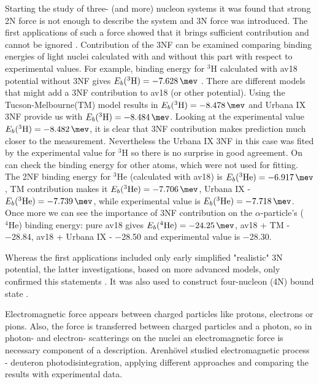 Starting the study of three- (and more) nucleon systems it was found that 
strong 2N force is not enough to describe
the system and 3N force was introduced. The first applications of such
a force showed that it brings sufficient contribution and cannot be ignored \cite{GLOCKLE1982343}.
Contribution of the 3NF can be examined comparing binding energies of light nuclei calculated
with and without this part with respect to experimental values.  
For example, binding energy for $^3$H calculated with \gls{av18} potential
without 3NF gives $E_b(^3\mathrm{H}) = \SI{-7.628}{\mev}$ \cite{NoggaAV18}. There are different
models that might add a 3NF contribution to \gls{av18} (or other potential). 
Using the Tucson-Melbourne(TM) model \cite{Tucson-Melbourne}   results
in $E_b(^3\mathrm{H}) = \SI{-8.478}{\mev}$ and Urbana IX \cite{Urbana3NF} 3NF provide us with 
$E_b(^3\mathrm{H}) = \SI{-8.484}{\mev}$. 
Looking at the experimental value $E_b(^3\mathrm{H}) = \SI{-8.482}{\mev}$,
it is clear that 3NF contribution makes prediction much closer to the measurement.
Nevertheless the Urbana IX 3NF in this case was fited by the experimental value for 
$^3\mathrm{H}$ so there is no surprise in good agreement.
On can check the binding energy for  other atoms, which were not used for fitting. 
The 2NF binding energy for $^3$He (calculated with \gls{av18})
is $E_b(^3\mathrm{He}) = \SI{-6.917}{\mev}$, TM contribution makes it $E_b(^3\mathrm{He}) = \SI{-7.706}{\mev}$,
Urbana IX - $E_b(^3\mathrm{He}) = \SI{-7.739}{\mev}$, while experimental value
is $E_b(^3\mathrm{He}) = \SI{-7.718}{\mev}$.
Once more we can see the importance of 3NF contribution on the $\alpha$-particle's ($^4\mathrm{He}$) binding energy:
pure \gls{av18} gives $E_b(^4\mathrm{He}) = \SI{-24.25}{\mev}$, \gls{av18} + TM - \SI{-28.84}{\mev}, \gls{av18} + Urbana IX - \SI{-28.50}{\mev} and experimental value
is \SI{-28.30}{\mev}.

Whereas the first applications included only early simplified "realistic" 3N potential, the latter
investigations, based on more advanced models, only confirmed this statements \cite{StoksPhysRevC49, WIRINGAPhysRevC51}.
It was also used to construct four-nucleon (4N) bound state \cite{NoggaPhysRevLett}.

Electromagnetic force appears between charged particles like protons, electrons or pions.
Also, the force is transferred between charged particles and a photon, so 
in photon- and electron- scatterings on the nuclei an electromagnetic
force is necessary component of a description. Arenh\"{o}vel \cite{ArenhovelPhotodisint1991} 
studied electromagnetic process - deuteron photodisintegration,
applying different approaches and comparing the results with
experimental data.

